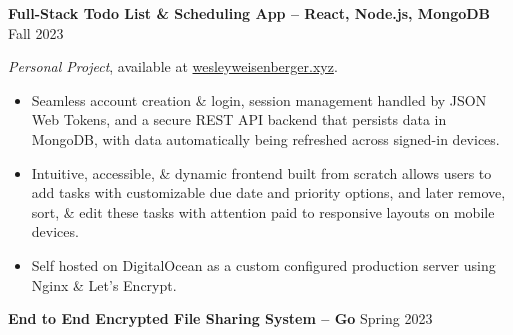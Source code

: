 \documentclass{article}
\begin{document}
\begin{adjustwidth}{1em}{1em}



    \textbf{Full-Stack Todo List \& Scheduling App -- React, Node.js, MongoDB} \hfill Fall 2023

    \textit{Personal Project}, available at \href{https://wesleyweisenberger.xyz}{wesleyweisenberger.xyz}.
    \begin{itemize}
        \item Seamless account creation \& login, session management handled by JSON Web Tokens, and a secure REST API backend that persists data in MongoDB, with data automatically being refreshed across signed-in devices.
        \item Intuitive, accessible, \& dynamic frontend built from scratch allows users to add tasks with customizable due date and priority options, and later remove, sort, \& edit these tasks with attention paid to responsive layouts on mobile devices.
        \item Self hosted on DigitalOcean as a custom configured production server using Nginx \& Let's Encrypt.
    \end{itemize}



    \vspace{1mm}








    \vspace{1mm}



    \textbf{End to End Encrypted File Sharing System -- Go} \hfill Spring 2023


\end{adjustwidth}
\end{document}
